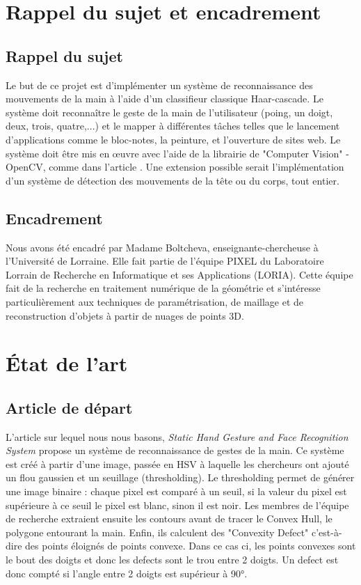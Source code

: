 \documentclass[11pt]{article}
\begin{document}
\newpage

\section{Rappel du sujet et encadrement}
\subsection{Rappel du sujet}

Le but de ce projet est d’implémenter un système de reconnaissance des mouvements de la
main à l’aide d’un classifieur classique Haar-cascade. Le système doit reconnaître le geste de
la main de l’utilisateur (poing, un doigt, deux, trois, quatre,...) et le mapper à différentes tâches
telles que le lancement d’applications comme le bloc-notes, la peinture, et l’ouverture de sites web.
Le système doit être mis en œuvre avec l’aide de la librairie de "Computer Vision" - OpenCV,
comme dans l’article \cite{joshi_static_2021}. Une extension possible serait l’implémentation d’un système de détection
des mouvements de la tête ou du corps, tout entier.

\subsection{Encadrement}
Nous avons été encadré par Madame Boltcheva, enseignante-chercheuse à l'Université de Lorraine. Elle fait partie de l'équipe PIXEL du Laboratoire Lorrain de Recherche en Informatique et ses Applications (LORIA). Cette équipe fait de la recherche en traitement numérique de la géométrie et s'intéresse particulièrement aux techniques de paramétrisation, de maillage et de reconstruction d'objets à partir de nuages de points 3D.


\newpage

\section{\'Etat de l'art}
\subsection{Article de départ}
L'article sur lequel nous nous basons, \textit{Static Hand Gesture and Face Recognition System} \cite{joshi_static_2021} propose un système de reconnaissance de gestes de la main. Ce système est créé à partir d'une image, passée en HSV à laquelle les chercheurs ont ajouté un flou gaussien et un seuillage (thresholding). Le thresholding permet de générer une image binaire : chaque pixel est comparé à un seuil, si la valeur du pixel est supérieure à ce seuil le pixel est blanc, sinon il est noir. Les membres de l'équipe de recherche extraient ensuite les contours avant de tracer le Convex Hull, le polygone entourant la main. Enfin, ils calculent des "Convexity Defect" c'est-à-dire des points éloignés de points convexe. Dans ce cas ci, les points convexes sont le bout des doigts et donc les defects sont le trou entre 2 doigts. Un defect est donc compté si l'angle entre 2 doigts est supérieur à 90°.
\end{document}
